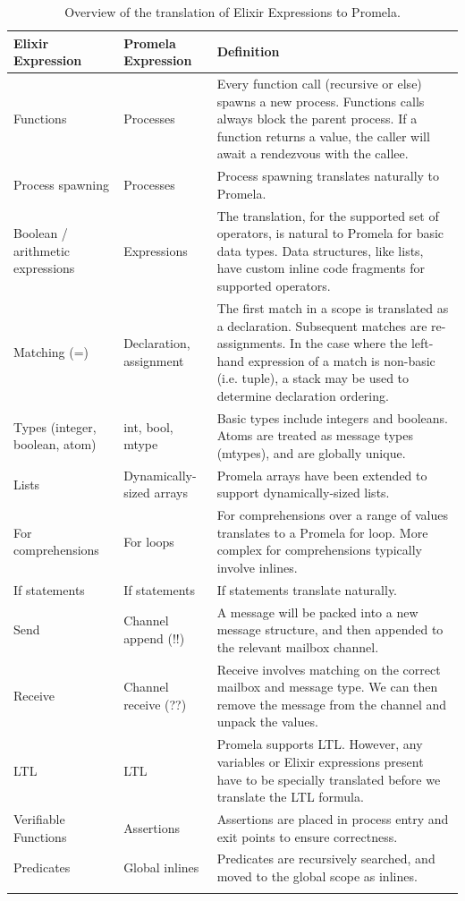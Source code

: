 \begin{longtable}{|>{\raggedright\arraybackslash}p{4cm}|>{\raggedright\arraybackslash}p{4cm}|>{\raggedright\arraybackslash}p{6cm}|}
    \hline
        \textbf{Elixir Expression} & \textbf{Promela Expression} & \textbf{Definition} \\
        \hline
        Functions & Processes & Every function call (recursive or else) spawns a new process. Functions calls always block the parent process. If a function returns a value, the caller will await a rendezvous with the callee. \\
        \hline
        Process spawning & Processes & Process spawning translates naturally to Promela. \\
        \hline
        Boolean / arithmetic expressions & Expressions & The translation, for the supported set of operators, is natural to Promela for basic data types. Data structures, like lists, have custom inline code fragments for supported operators. \\
        \hline
        Matching (=) & Declaration, assignment & The first match in a scope is translated as a declaration. Subsequent matches are re-assignments. In the case where the left-hand expression of a match is non-basic (i.e. tuple), a stack may be used to determine declaration ordering. \\
        \hline
        Types (integer, boolean, atom) & int, bool, mtype & Basic types include integers and booleans. Atoms are treated as message types (mtypes), and are globally unique. \\
        \hline
        Lists & Dynamically-sized arrays & Promela arrays have been extended to support dynamically-sized lists. \\
        \hline
        For comprehensions & For loops &  For comprehensions over a range of values translates to a Promela for loop. More complex for comprehensions typically involve inlines. \\
        \hline
        If statements & If statements & If statements translate naturally. \\
        \hline
        Send & Channel append (!!) & A message will be packed into a new message structure, and then appended to the relevant mailbox channel. \\
        \hline
        Receive & Channel receive (??) & Receive involves matching on the correct mailbox and message type. We can then remove the message from the channel and unpack the values. \\
        \hline
        LTL & LTL & Promela supports LTL. However, any variables or Elixir expressions present have to be specially translated before we translate the LTL formula. \\
        \hline
        Verifiable Functions & Assertions & Assertions are placed in process entry and exit points to ensure correctness. \\
        \hline
        Predicates & Global inlines & Predicates are recursively searched, and moved to the global scope as inlines. \\
        \hline
    \caption{Overview of the translation of Elixir Expressions to Promela.}
    \label{table:translation}
\end{longtable}
